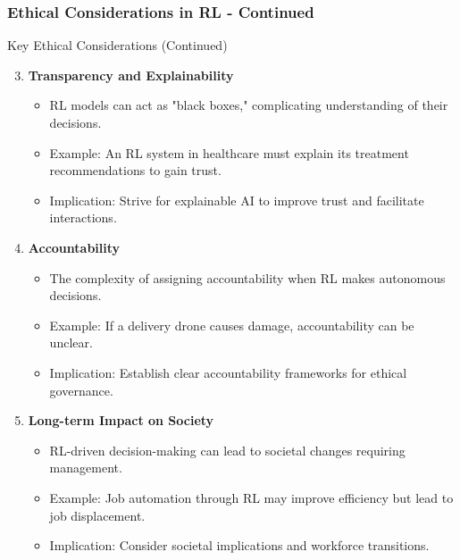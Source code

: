 \documentclass[aspectratio=169]{beamer}
\begin{document}
\begin{frame}[fragile]
    \frametitle{Ethical Considerations in RL - Continued}
    \begin{block}{Key Ethical Considerations (Continued)}
        \begin{enumerate}
            \setcounter{enumi}{2} %
            \item \textbf{Transparency and Explainability}
                \begin{itemize}
                    \item RL models can act as "black boxes," complicating understanding of their decisions.
                    \item Example: An RL system in healthcare must explain its treatment recommendations to gain trust.
                    \item Implication: Strive for explainable AI to improve trust and facilitate interactions.
                \end{itemize}

            \item \textbf{Accountability}
                \begin{itemize}
                    \item The complexity of assigning accountability when RL makes autonomous decisions.
                    \item Example: If a delivery drone causes damage, accountability can be unclear.
                    \item Implication: Establish clear accountability frameworks for ethical governance.
                \end{itemize}

            \item \textbf{Long-term Impact on Society}
                \begin{itemize}
                    \item RL-driven decision-making can lead to societal changes requiring management.
                    \item Example: Job automation through RL may improve efficiency but lead to job displacement.
                    \item Implication: Consider societal implications and workforce transitions.
                \end{itemize}
        \end{enumerate}
    \end{block}

\end{frame}
\end{document}
